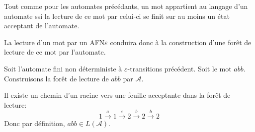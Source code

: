 \begin{remark}
    Tout comme pour les automates précédants, un mot appartient au langage d'un automate ssi 
    la lecture de ce mot par celui-ci se finit sur au moins un état acceptant de l'automate. 

    \vspace{0.3cm}

    La lecture d'un mot par un AFN$\varepsilon$ conduira donc à la construction d'une forêt de lecture de ce mot 
    par l'automate. 
\end{remark}

\begin{example}
    Soit l'automate fini non déterministe à $\varepsilon$-transitions précédent. 
    Soit le mot $abb$. Construisons la forêt de lecture de $abb$ par $ \mathcal{A}$. 

    \begin{center}
    \end{center}

    Il existe un chemin d'un racine vers une feuille acceptante dans la forêt de lecture: 
        \[ 1 \overset{a}{\longrightarrow} 1 \overset{\varepsilon}{\longrightarrow} 2 \overset{b}{\longrightarrow} 2 \overset{b}{\longrightarrow} 2 \] 
    Donc par définition, $abb \in L( \mathcal{A} )$. 
\end{example}

